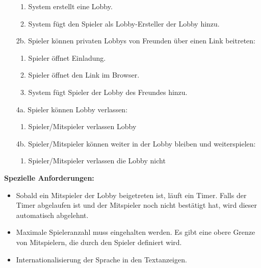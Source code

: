\documentclass[11pt,ngerman]{article}
\begin{document}
\begin{tcolorbox}
\begin{itemize}
\begin{enumerate}
                            \item System erstellt eine \Gls{Lobby}.
                            \item System fügt den Spieler als Lobby-Ersteller der \Gls{Lobby} hinzu.
                        \end{enumerate}
                        \item[2b.] Spieler können privaten \Glspl{Lobby} von Freunden über einen Link beitreten:
                        \begin{enumerate}
                            \item Spieler öffnet Einladung.
                            \item Spieler öffnet den Link im Browser.
                            \item System fügt Spieler der \Gls{Lobby} des Freundes hinzu.
                        \end{enumerate}
                        \item[4a.] Spieler können \Gls{Lobby} verlassen:
                        \begin{enumerate}
                            \item Spieler/Mitspieler verlassen \Gls{Lobby}
                        \end{enumerate}
                        \item[4b.] Spieler/Mitspieler können weiter in der \Gls{Lobby} bleiben und weiterspielen:
                        \begin{enumerate}
                            \item Spieler/Mitspieler verlassen die \Gls{Lobby} nicht
                        \end{enumerate}
                    \end{itemize}
                    \textbf{Spezielle Anforderungen:}
                    \begin{itemize}
                        \item Sobald ein Mitspieler der \Gls{Lobby} beigetreten ist, läuft ein Timer. Falls der Timer abgelaufen ist und der Mitspieler noch nicht bestätigt hat, wird dieser automatisch abgelehnt.
                        \item Maximale Spieleranzahl muss eingehalten werden. Es gibt eine obere Grenze von Mitspielern, die durch den Spieler definiert wird.
                        \item Internationalisierung der Sprache in den Textanzeigen.
                    \end{itemize}

                \end{tcolorbox}
\end{document}
